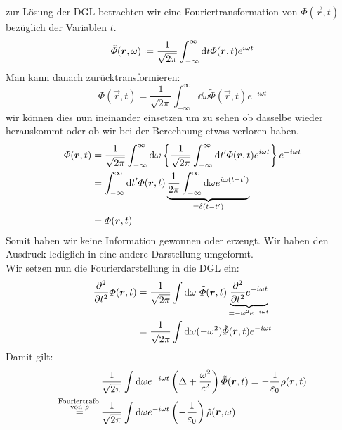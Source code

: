 zur Lösung der DGL betrachten wir eine Fouriertransformation von $ \Phi (\vec{r},t) $ bezüglich der Variablen $ t $.
\begin{equation*}
\tilde{\Phi}(\vec{r},\omega) \defeq \frac{1}{\sqrt{2 \pi}} \int_{- \infty}^{\infty} \dd t \Phi (\vec{r},t) e^{i \omega t}
\end{equation*}
Man kann danach zurücktransformieren:
\begin{equation*}
\Phi (\vec{r},t) = \frac{1}{\sqrt{2 \pi}} \int_{-\infty}^{\infty} \dd \omega \tilde{\Phi} (\vec{r},t) e^{- i \omega t}
\end{equation*}
wir können dies nun ineinander einsetzen um zu sehen ob dasselbe wieder herauskommt oder ob wir bei der Berechnung etwas verloren haben.
\begin{align*}
\varPhi(\bm{r},t) &= \frac{1}{\sqrt{2 \pi}} \int_{- \infty}^{\infty} \textrm{d} \omega \left\{ \frac{1}{\sqrt{2 \pi}} \int_{- \infty}^{\infty} \textrm{d} t' \varPhi(\bm{r},t) e^{i \omega t}\right\} e^{- i \omega t} \\
&= \int_{- \infty}^{\infty} \textrm{d} t' \varPhi(\bm{r},t) \underbrace{\frac{1}{2 \pi} \int_{-\infty}^{\infty} \textrm{d} \omega e^{i \omega (t - t')}}_{= \delta(t - t')}\\
&= \varPhi (\bm{r},t)
\end{align*}
Somit haben wir keine Information gewonnen oder erzeugt. Wir haben den Ausdruck lediglich in eine andere Darstellung umgeformt.\\[5pt]
Wir setzen nun die Fourierdarstellung in die DGL ein:
\begin{align*}
\frac{\partial ^2}{\partial t^2} \varPhi(\bm{r},t) &= \frac{1}{\sqrt{2 \pi}} \int \textrm{d} \omega \ \tilde{\varPhi} (\bm{r},t) \underbrace{\frac{\partial ^2}{\partial t^2} e^{- i \omega t}}_{= - \omega^2 e^{- i \omega t}}\\
&= \frac{1}{\sqrt{2 \pi}} \int \textrm{d} \omega (- \omega ^2) \tilde{\varPhi} (\bm{r},t) e^{- i \omega t}
\end{align*}
Damit gilt:
\begin{align*}
& \frac{1}{\sqrt{2 \pi}} \int \textrm{d} \omega e^{- i \omega t} \left(\Delta + \frac{\omega^2}{c^2}\right) \tilde{\varPhi} (\bm{r},t) = - \frac{1}{\varepsilon_0} \rho (\bm{r},t)\\
\overset{\substack{\textrm{Fouriertrafo.} \\ \textrm{von } \rho}}{=} & \frac{1}{\sqrt{2 \pi}} \int \textrm{d} \omega e^{- i \omega t} \left(- \frac{1}{\varepsilon_0}\right) \tilde{\rho} (\bm{r},\omega)
\end{align*}

